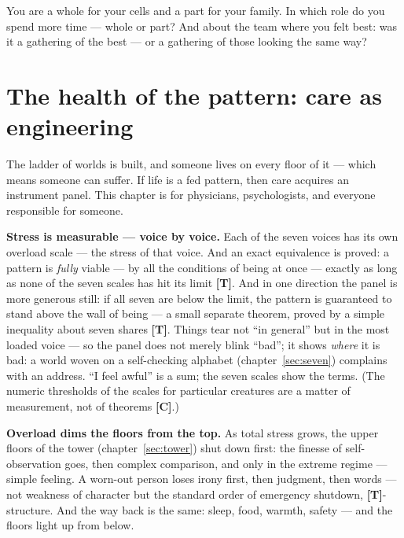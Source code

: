 \documentclass[11pt,letterpaper]{article}
\newcommand{\stT}{\textbf{[T]}\xspace}
\newcommand{\stC}{\textbf{[C]}\xspace}
\begin{document}
\begin{askbox}
You are a whole for your cells and a part for your family. In which
role do you spend more time --- whole or part? And about the team
where you felt best: was it a gathering of the best --- or a
gathering of those looking the same way?
\end{askbox}

\section{The health of the pattern: care as engineering}
\label{sec:health}

The ladder of worlds is built, and someone lives on every floor of
it --- which means someone can suffer. If life is a fed pattern,
then care acquires an instrument panel.
This chapter is for physicians, psychologists, and everyone
responsible for someone.

\textbf{Stress is measurable --- voice by voice.} Each of the seven
voices has its own overload scale --- the stress of that voice. And
an exact equivalence is proved: a pattern is \emph{fully} viable ---
by all the conditions of being at once --- exactly as long as none
of the seven scales has hit its limit \stT. And in one direction the
panel is more generous still: if all seven are below the limit, the
pattern is guaranteed to stand above the wall of being --- a small
separate theorem, proved by a simple inequality about seven shares
\stT. Things tear
not ``in general'' but in the most loaded voice --- so the panel
does not merely blink ``bad''; it shows \emph{where} it is bad: a
world woven on a self-checking alphabet (chapter~\ref{sec:seven})
complains with an address. ``I feel awful'' is a sum; the seven
scales show the terms. (The numeric thresholds of the scales for
particular creatures are a matter of measurement, not of theorems
\stC.)

\textbf{Overload dims the floors from the top.} As total stress
grows, the upper floors of the tower (chapter~\ref{sec:tower}) shut
down first: the finesse of self-observation goes, then complex
comparison, and only in the extreme regime --- simple feeling. A
worn-out person loses irony first, then judgment, then words ---
not weakness of character but the standard order of emergency
shutdown, \stT-structure. And the way back is the same: sleep,
food, warmth, safety --- and the floors light up from below.
\end{document}
